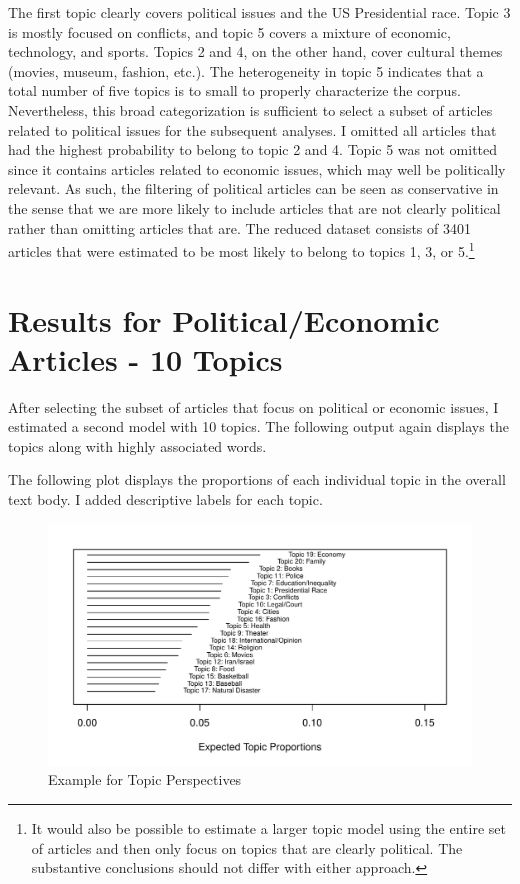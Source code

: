 \documentclass[12pt]{article}
\begin{document}
\begin{doublespace}
The first topic clearly covers political issues and the US Presidential race. Topic 3 is mostly focused on conflicts, and topic 5 covers a mixture of economic, technology, and sports. Topics 2 and 4, on the other hand, cover cultural themes (movies, museum, fashion, etc.). The heterogeneity in topic 5 indicates that a total number of five topics is to small to properly characterize the corpus. Nevertheless, this broad categorization is sufficient to select a subset of articles related to political issues for the subsequent analyses. I omitted all articles that had the highest probability to belong to topic 2 and 4. Topic 5 was not omitted since it contains articles related to economic issues, which may well be politically relevant. As such, the filtering of political articles can be seen as conservative in the sense that we are more likely to include articles that are not clearly political rather than omitting articles that are. The reduced dataset consists of 3401 articles that were estimated to be most likely to belong to topics 1, 3, or 5.\footnote{It would also be possible to estimate a larger topic model using the entire set of articles and then only focus on topics that are clearly political. The substantive conclusions should not differ with either approach.}


\section{Results for Political/Economic Articles - 10 Topics}

After selecting the subset of articles that focus on political or economic issues, I estimated a second model with 10 topics. The following output again displays the topics along with highly associated words.


The following plot displays the proportions of each individual topic in the overall text body. I added descriptive labels for each topic.

\begin{figure}
\caption{Example for Topic Perspectives}\label{fig:prop}
\includegraphics[width=\textwidth]{../calc/fig/prop} 
\end{figure}


\end{doublespace}
\end{document}
